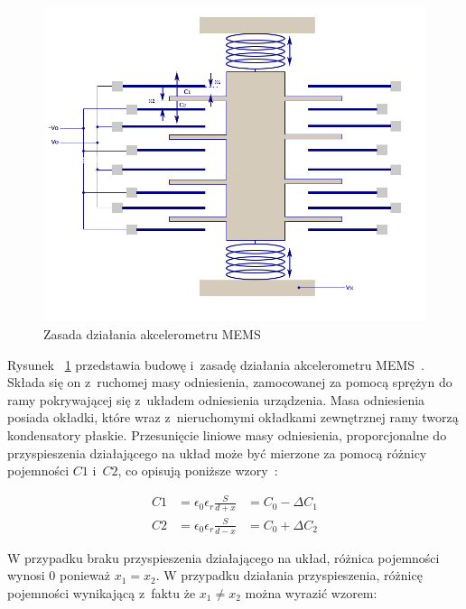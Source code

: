 \documentclass[11pt, twoside]{Thesis} %
\begin{document}
\begin{figure}[H]
	\centering
	\includegraphics[scale=0.4]{Pictures/MEMS-Accelerometer_struct.png}
		\caption[Zasada działania akcelerometru MEMS]{Zasada działania akcelerometru MEMS}
	\label{fig:MEMS-Accelerometer_struct}
\end{figure}

Rysunek ~\ref{fig:MEMS-Accelerometer_struct} przedstawia budowę i~zasadę działania akcelerometru MEMS~\cite{mems12, mems13}. Składa się on z~ruchomej masy odniesienia, zamocowanej za pomocą sprężyn do ramy pokrywającej się z~układem odniesienia urządzenia. Masa odniesienia posiada okładki, które wraz z~nieruchomymi okładkami zewnętrznej ramy tworzą kondensatory płaskie. Przesunięcie liniowe masy odniesienia, proporcjonalne do przyspieszenia działającego na układ może być mierzone za pomocą różnicy pojemności $C1$ i~$C2$, co opisują poniższe wzory~\cite{mems12}:

\begin{equation}
\begin{aligned}
C1 &= \epsilon_0\epsilon_r\frac{S}{d + x} &= C_0 - \Delta{C_1} \\
C2 &= \epsilon_0\epsilon_r\frac{S}{d - x} &= C_0 + \Delta{C_2}
\end{aligned}
\label{C_to_delta}
\end{equation} 

W przypadku braku przyspieszenia działającego na układ, różnica pojemności wynosi $0$ ponieważ $x_1 = x_2$. W przypadku działania przyspieszenia, różnicę pojemności wynikającą z~faktu że $x_1 \neq x_2$ można wyrazić wzorem:
\end{document}
